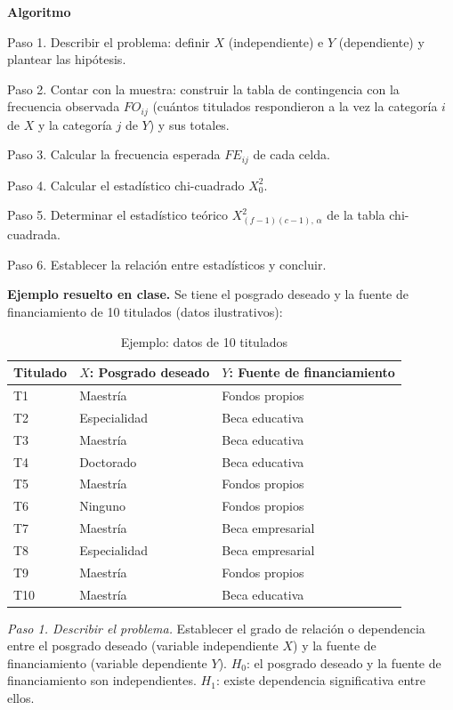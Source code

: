 \documentclass[12pt, a4paper]{article}
\newenvironment{mitabla}[2][H]{%
  \begin{table}[#1]
  \centering
  \caption{#2}
  \small
}{%
  \end{table}
}
\begin{document}
\textbf{Algoritmo}

Paso 1. Describir el problema: definir $X$ (independiente) e $Y$
(dependiente) y plantear las hipótesis.

Paso 2. Contar con la muestra: construir la tabla de contingencia con la
frecuencia observada $FO_{ij}$ (cuántos titulados respondieron a la vez la
categoría $i$ de $X$ y la categoría $j$ de $Y$) y sus totales.

Paso 3. Calcular la frecuencia esperada $FE_{ij}$ de cada celda.

Paso 4. Calcular el estadístico chi-cuadrado $X_0^2$.

Paso 5. Determinar el estadístico teórico $X^2_{(f-1)(c-1),\,\alpha}$ de
la tabla chi-cuadrada.

Paso 6. Establecer la relación entre estadísticos y concluir.

\textbf{Ejemplo resuelto en clase.} Se tiene el posgrado deseado y la
fuente de financiamiento de 10 titulados (datos ilustrativos):

\begin{mitabla}{Ejemplo: datos de 10 titulados}
\begin{tabular}{lll}
\toprule
Titulado & $X$: Posgrado deseado & $Y$: Fuente de financiamiento \\
\midrule
T1 & Maestría & Fondos propios \\
T2 & Especialidad & Beca educativa \\
T3 & Maestría & Beca educativa \\
T4 & Doctorado & Beca educativa \\
T5 & Maestría & Fondos propios \\
T6 & Ninguno & Fondos propios \\
T7 & Maestría & Beca empresarial \\
T8 & Especialidad & Beca empresarial \\
T9 & Maestría & Fondos propios \\
T10 & Maestría & Beca educativa \\
\bottomrule
\end{tabular}
\end{mitabla}

\textit{Paso 1. Describir el problema.} Establecer el grado de relación
o dependencia entre el posgrado deseado (variable independiente $X$) y la
fuente de financiamiento (variable dependiente $Y$).
$H_0$: el posgrado deseado y la fuente de financiamiento son
independientes. $H_1$: existe dependencia significativa entre ellos.
\end{document}
